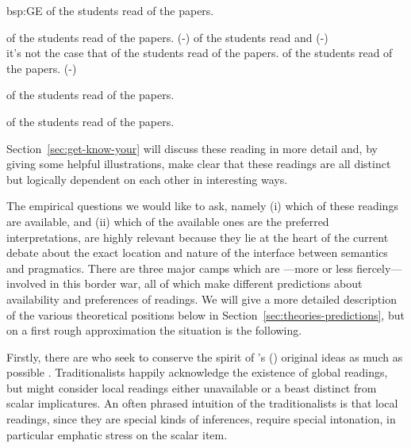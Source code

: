 \documentclass[fleqn,reqno,10pt,draft]{article}
\newcommand{\lit}{\acro{lit}}
\newcommand{\glb}{\acro{glb}}
\newcommand{\loc}{\acro{loc}}
\renewcommand{\es}{\acro{es}}
\newcommand{\mymark}[1]{{\color{mycol}{#1}}}
\begin{document}
\begin{exer}{bsp:GE}
\ex \mymark{Exactly one} of the students read {\mymark{some}} of the
  papers.

  \begin{xlist}
  \ex \label{bsp:GE-Literal} \mymark{Exactly one} of the students read
    {\mymark{some and maybe all}} of the papers. \hfill (\es-\lit)
  \ex \label{bsp:GE-Global}
    \mymark{Exactly one} of the students read \mymark{some and maybe all} 
    and  \hfill (\es-\glb)\\
    it's not the case that \mymark{exactly one} of the students read \mymark{all} of the papers.
  \ex \label{bsp:GE-Local}
    \mymark{Exactly one} of the students read {\mymark{some  but not all}} of the
    papers. \hfill (\es-\loc)
  \end{xlist}
\end{exer}


\begin{exe}
\ex \label{bsp:AE-Alternative} \mymark{All} of the students read
  {\mymark{all}} of the papers. 

\ex \label{bsp:GE-Alternative} \mymark{Exactly one} of the students
  read {\mymark{all}} of the papers.
\end{exe}

\noindent Section~\ref{sec:get-know-your} will discuss these reading
in more detail and, by giving some helpful illustrations, make clear
that these readings are all distinct but logically dependent
on each other in interesting ways.

The empirical questions we would like to ask, namely (i) which of
these readings are available, and (ii) which of the available ones are
the preferred interpretations, are highly relevant because they lie at
the heart of the current debate about the exact location and nature of
the interface between semantics and pragmatics. There are three major
camps which are ---more or less fiercely--- involved in this border
war, all of which make different predictions about availability and
preferences of readings. We will give a more detailed description of
the various theoretical positions below in
Section~\ref{sec:theories-predictions}, but on a first rough
approximation the situation is the following. 

Firstly, there are \mymark{pragmatic traditionalists} who seek to
conserve the spirit of \citeauthor{Grice1975:Logic-and-Conve}'s
(\citeyear{Grice1975:Logic-and-Conve}) original ideas as much as
possible
\citep[e.g.][]{Spector2006:Scalar-Implicat,Sauerland2004:Scalar-Implicat,Russell2006:Against-Grammat,vanRooijSchulz:ExhaustiveInterpretation,Geurts2010:Quantity-Implic,Franke2011:Quantity-Implic}. Traditionalists
happily acknowledge the existence of global readings, but might
consider local readings either unavailable or a beast distinct from
scalar implicatures. An often phrased intuition of the traditionalists
is that local readings, since they are special kinds of inferences,
require special intonation, in particular emphatic stress on the
scalar item.
\end{document}
